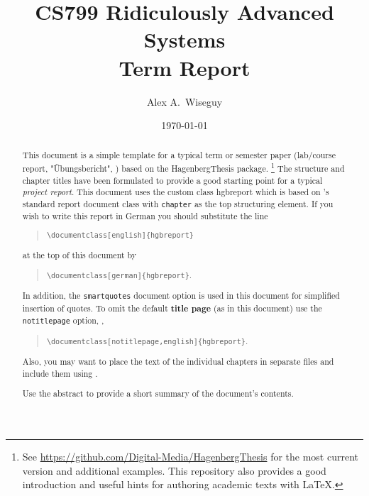 \documentclass[english,notitlepage,smartquotes]{hgbreport}
\begin{document}

\author{Alex A.\ Wiseguy}                    %
\title{CS799 Ridiculously Advanced Systems\\ %
			Term Report}	                 %
\date{\today}

\maketitle

\begin{abstract}\noindent
This document is a simple template for a typical term or semester paper
(lab/course report, "Übungsbericht", \etc) based on the \textsf{HagenbergThesis}
\latex package.%
\footnote{See \url{https://github.com/Digital-Media/HagenbergThesis} for the
	most current version and additional examples. This repository also provides
	a good introduction and useful hints for authoring academic texts with
	LaTeX.}
The structure and chapter titles have been formulated to provide a good starting
point for a typical \emph{project report}.
This document uses the custom class \textsf{hgbreport} which is based on
\latex's standard \textsf{report} document class with \texttt{chapter} as the
top structuring element. 
If you wish to write this report in German you should substitute the line
%
\begin{quote}
	\verb!\documentclass[english]{hgbreport}! 
\end{quote}
%
at the top of this document by
%
\begin{quote}
	\verb!\documentclass[german]{hgbreport}!.
\end{quote}
%
In addition, the \texttt{smartquotes} document option is used in this document
for simplified insertion of quotes. To omit the default \textbf{title page}
(as in this document) use the \texttt{notitlepage} option, \eg,
%
\begin{quote}
	\verb!\documentclass[notitlepage,english]{hgbreport}!.
\end{quote}
%
Also, you may want to place the text of the individual chapters in separate
files and include them using \verb!!.

\bigskip
\noindent
Use the abstract to provide a short summary of the document's contents.
\end{abstract}
\end{document}

